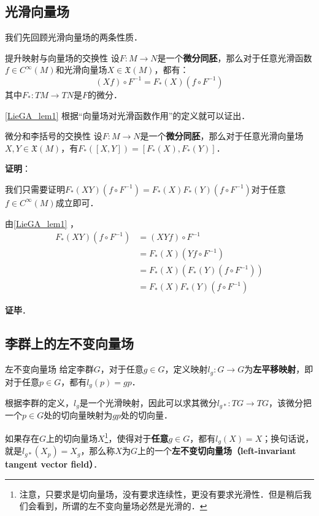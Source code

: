 

\subsection{光滑向量场}

我们先回顾光滑向量场的两条性质．

\begin{lemma}{提升映射与向量场的交换性}\label{LieGA_lem1}
设$F:M\to N$是一个\textbf{微分同胚}，那么对于任意光滑函数$f\in C^{\infty}(M)$和光滑向量场$X\in\mathfrak{X}(M)$，都有：
\begin{equation}\label{LieGA_eq1}
(Xf)\circ F^{-1}=F_*(X)(f\circ F^{-1})
\end{equation}
其中$F_*:TM\to TN$是$F$的微分．
\end{lemma}

\autoref{LieGA_lem1} 根据“向量场对光滑函数作用”的定义就可以证出．

\begin{lemma}{微分和李括号的交换性}\label{LieGA_lem2}
设$F:M\to N$是一个\textbf{微分同胚}，那么对于任意光滑向量场$X, Y\in\mathfrak{X}(M)$，有$F_*([X, Y])=[F_*(X), F_*(Y)]$．
\end{lemma}

\textbf{证明}：

我们只需要证明$F_*(XY)(f\circ F^{-1})=F_*(X)F_*(Y)(f\circ F^{-1})$对于任意$f\in C^{\infty}(M)$成立即可．

由\autoref{LieGA_lem1} ，
\begin{equation}
\begin{aligned}
F_*(XY)(f\circ F^{-1})&=(XYf)\circ F^{-1}\\
&=F_*(X)(Yf\circ F^{-1})\\
&=F_*(X)(F_*(Y)(f\circ F^{-1}))\\
&=F_*(X)F_*(Y)(f\circ F^{-1})
\end{aligned}
\end{equation}

\textbf{证毕}．

\subsection{李群上的左不变向量场}

\begin{definition}{左不变向量场}\label{LieGA_def1}
给定李群$G$，对于任意$g\in G$，定义映射$l_g:G\to G$为\textbf{左平移映射}，即对于任意$p\in G$，都有$l_g(p)=gp$．

根据李群的定义，$l_g$是一个光滑映射，因此可以求其微分$l_{g*}:TG\to TG$，该微分把一个$p\in G$处的切向量映射为$gp$处的切向量．

如果存在$G$上的切向量场$X$\footnote{注意，只要求是切向量场，没有要求连续性，更没有要求光滑性．但是稍后我们会看到，所谓的左不变向量场必然是光滑的．}，使得对于\textbf{任意}$g\in G$，都有$l_g(X)=X$；换句话说，就是$l_{g*}(X_p)=X_g$，那么称$X$为$G$上的一个\textbf{左不变切向量场（left-invariant tangent vector field）}．
\end{definition}

